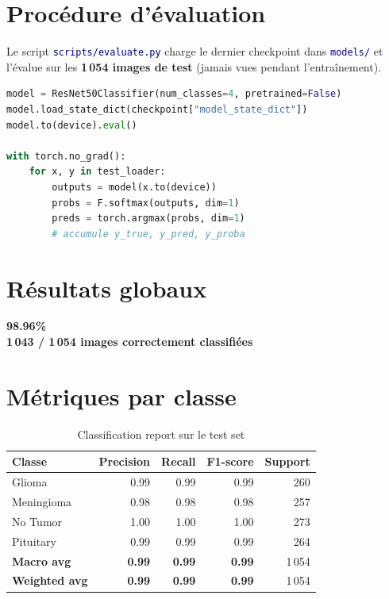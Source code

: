 \documentclass[11pt,a4paper,oneside]{report}
\newcommand{\code}[1]{\texttt{\textcolor{navy}{#1}}}
\newcommand{\rt}[1]{\textcolor{accentred}{#1}}
\newcommand{\og}[1]{\textcolor{accentorange}{#1}}
\newcommand{\gn}[1]{\textcolor{accentgreen}{#1}}
\newcommand{\bl}[1]{\textcolor{accentblue}{#1}}
\begin{document}
\section{Procédure d'évaluation}

Le script \code{scripts/evaluate.py} charge le dernier checkpoint dans \code{models/} et l'évalue sur les \textbf{1\,054 images de test} (jamais vues pendant l'entraînement).

\begin{lstlisting}[language=Python, caption={Pipeline d'évaluation simplifié}]
model = ResNet50Classifier(num_classes=4, pretrained=False)
model.load_state_dict(checkpoint["model_state_dict"])
model.to(device).eval()

with torch.no_grad():
    for x, y in test_loader:
        outputs = model(x.to(device))
        probs = F.softmax(outputs, dim=1)
        preds = torch.argmax(probs, dim=1)
        # accumule y_true, y_pred, y_proba
\end{lstlisting}

\section{Résultats globaux}

\begin{successbox}
\centering
\Huge\bfseries\color{accentgreen} 98.96\%
\normalsize\\[0.3cm]
\textbf{1\,043 / 1\,054 images correctement classifiées}
\end{successbox}

\section{Métriques par classe}

\begin{table}[!htbp]
\centering
\caption{Classification report sur le test set}
\begin{tabular}{lrrrr}
\toprule
\textbf{Classe} & \textbf{Precision} & \textbf{Recall} & \textbf{F1-score} & \textbf{Support} \\
\midrule
\rt{Glioma}      & 0.99 & 0.99 & 0.99 & 260 \\
\og{Meningioma}  & 0.98 & 0.98 & 0.98 & 257 \\
\gn{No Tumor}    & 1.00 & 1.00 & 1.00 & 273 \\
\bl{Pituitary}   & 0.99 & 0.99 & 0.99 & 264 \\
\midrule
\textbf{Macro avg}    & \textbf{0.99} & \textbf{0.99} & \textbf{0.99} & 1\,054 \\
\textbf{Weighted avg} & \textbf{0.99} & \textbf{0.99} & \textbf{0.99} & 1\,054 \\
\bottomrule
\end{tabular}
\end{table}
\end{document}

